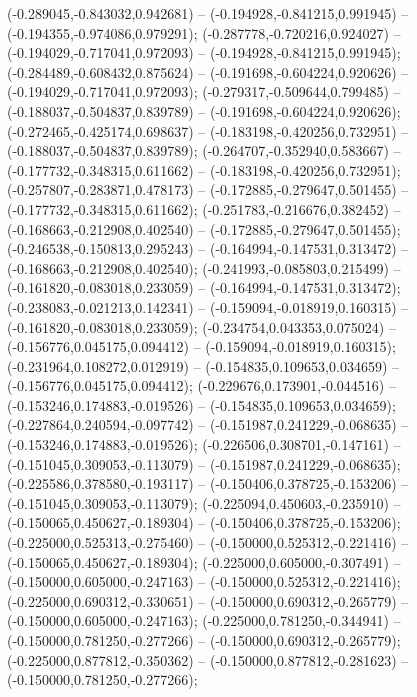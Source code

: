  (-0.289045,-0.843032,0.942681) -- (-0.194928,-0.841215,0.991945) -- (-0.194355,-0.974086,0.979291);
 (-0.287778,-0.720216,0.924027) -- (-0.194029,-0.717041,0.972093) -- (-0.194928,-0.841215,0.991945);
 (-0.284489,-0.608432,0.875624) -- (-0.191698,-0.604224,0.920626) -- (-0.194029,-0.717041,0.972093);
 (-0.279317,-0.509644,0.799485) -- (-0.188037,-0.504837,0.839789) -- (-0.191698,-0.604224,0.920626);
 (-0.272465,-0.425174,0.698637) -- (-0.183198,-0.420256,0.732951) -- (-0.188037,-0.504837,0.839789);
 (-0.264707,-0.352940,0.583667) -- (-0.177732,-0.348315,0.611662) -- (-0.183198,-0.420256,0.732951);
 (-0.257807,-0.283871,0.478173) -- (-0.172885,-0.279647,0.501455) -- (-0.177732,-0.348315,0.611662);
 (-0.251783,-0.216676,0.382452) -- (-0.168663,-0.212908,0.402540) -- (-0.172885,-0.279647,0.501455);
 (-0.246538,-0.150813,0.295243) -- (-0.164994,-0.147531,0.313472) -- (-0.168663,-0.212908,0.402540);
 (-0.241993,-0.085803,0.215499) -- (-0.161820,-0.083018,0.233059) -- (-0.164994,-0.147531,0.313472);
 (-0.238083,-0.021213,0.142341) -- (-0.159094,-0.018919,0.160315) -- (-0.161820,-0.083018,0.233059);
 (-0.234754,0.043353,0.075024) -- (-0.156776,0.045175,0.094412) -- (-0.159094,-0.018919,0.160315);
 (-0.231964,0.108272,0.012919) -- (-0.154835,0.109653,0.034659) -- (-0.156776,0.045175,0.094412);
 (-0.229676,0.173901,-0.044516) -- (-0.153246,0.174883,-0.019526) -- (-0.154835,0.109653,0.034659);
 (-0.227864,0.240594,-0.097742) -- (-0.151987,0.241229,-0.068635) -- (-0.153246,0.174883,-0.019526);
 (-0.226506,0.308701,-0.147161) -- (-0.151045,0.309053,-0.113079) -- (-0.151987,0.241229,-0.068635);
 (-0.225586,0.378580,-0.193117) -- (-0.150406,0.378725,-0.153206) -- (-0.151045,0.309053,-0.113079);
 (-0.225094,0.450603,-0.235910) -- (-0.150065,0.450627,-0.189304) -- (-0.150406,0.378725,-0.153206);
 (-0.225000,0.525313,-0.275460) -- (-0.150000,0.525312,-0.221416) -- (-0.150065,0.450627,-0.189304);
 (-0.225000,0.605000,-0.307491) -- (-0.150000,0.605000,-0.247163) -- (-0.150000,0.525312,-0.221416);
 (-0.225000,0.690312,-0.330651) -- (-0.150000,0.690312,-0.265779) -- (-0.150000,0.605000,-0.247163);
 (-0.225000,0.781250,-0.344941) -- (-0.150000,0.781250,-0.277266) -- (-0.150000,0.690312,-0.265779);
 (-0.225000,0.877812,-0.350362) -- (-0.150000,0.877812,-0.281623) -- (-0.150000,0.781250,-0.277266);
